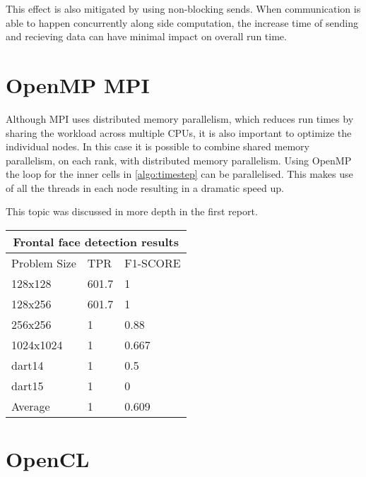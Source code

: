 \documentclass{article}
\begin{document}
\begin{multicols}{2}
This effect is also mitigated by using non-blocking sends. When communication
is able to happen concurrently along side computation, the increase time of
sending and recieving data can have minimal impact on overall run time.

\section{OpenMP MPI}

Although MPI uses distributed memory parallelism, which reduces run times by
sharing the workload across multiple CPUs, it is also important to optimize the
individual nodes. In this case it is possible to combine shared memory
parallelism, on each rank, with distributed memory parallelism. Using OpenMP
the loop for the inner cells in \autoref{algo:timestep} can be parallelised. This makes use of all the threads in each node resulting in a dramatic speed up.


This topic was discussed in more depth in the first report.


\begin{center}
\begin{tabular}{ |p{2cm}||p{2cm}|p{2cm}| }
 \hline
 \multicolumn{3}{|c|}{Frontal face detection results} \\
 \hline
 Problem Size & TPR & F1-SCORE \\
 \hline
 128x128 & 601.7  & 1         \\
 128x256 & 601.7  & 1         \\
 256x256  & 1   & 0.88      \\
 1024x1024 & 1   & 0.667  \\ 
 dart14 & 1   & 0.5       \\ 
 dart15 & 1   & 0         \\ 
 \hline
 Average & 1   & 0.609    \\ 
 \hline
\end{tabular}
\label{tab:vjfacesresults}
\end{center}

\section{OpenCL}


\end{multicols}
\end{document}
